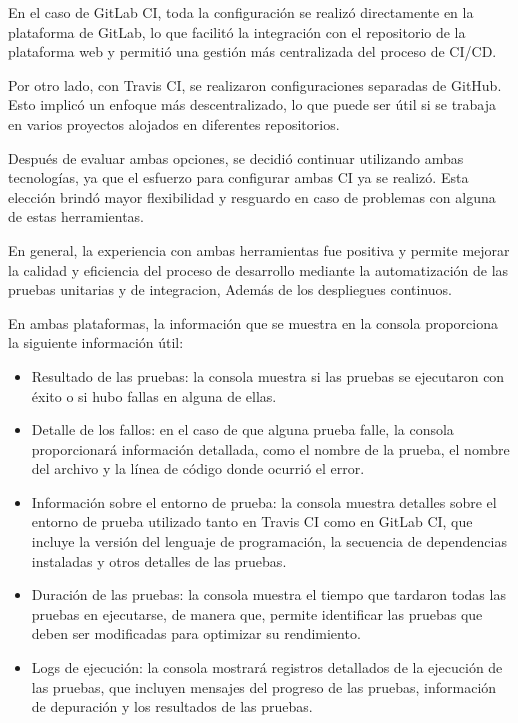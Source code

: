 En el caso de GitLab CI, toda la configuración se realizó directamente en la plataforma de GitLab, lo que facilitó la integración con el repositorio de la plataforma web y permitió una gestión más centralizada del proceso de CI/CD.

Por otro lado, con Travis CI, se realizaron configuraciones separadas de GitHub. Esto implicó un enfoque más descentralizado, lo que puede ser útil si se trabaja en varios proyectos alojados en diferentes repositorios.

Después de evaluar ambas opciones, se decidió continuar utilizando ambas tecnologías, ya que el esfuerzo para configurar ambas CI ya se realizó. Esta elección brindó mayor flexibilidad y resguardo en caso de problemas con alguna de estas herramientas.

En general, la experiencia con ambas herramientas fue positiva y permite mejorar la calidad y eficiencia del proceso de desarrollo mediante la automatización de las pruebas unitarias y de integracion, Además de los despliegues continuos.

En ambas plataformas, la información que se muestra en la consola proporciona la siguiente información útil:

\begin{itemize}
	\item Resultado de las pruebas: la consola muestra si las pruebas se ejecutaron con éxito o si hubo fallas en alguna de ellas. 
	
	\item Detalle de los fallos: en el caso de que alguna prueba falle, la consola proporcionará información detallada, como el nombre de la prueba, el nombre del archivo y la línea de código donde ocurrió el error.
	
	\item Información sobre el entorno de prueba: la consola muestra detalles sobre el entorno de prueba utilizado tanto en Travis CI  como en GitLab CI, que incluye la versión del lenguaje de programación, la secuencia de dependencias instaladas y otros detalles de las pruebas.
	
	\item Duración de las pruebas: la consola muestra el tiempo que tardaron todas las pruebas en ejecutarse,  de manera que, permite identificar las pruebas que deben ser modificadas para optimizar su rendimiento.
	
	\item Logs de ejecución: la consola mostrará registros detallados de la ejecución de las pruebas, que incluyen mensajes del progreso de las pruebas, información de depuración y los resultados de las pruebas.
	
\end{itemize}

